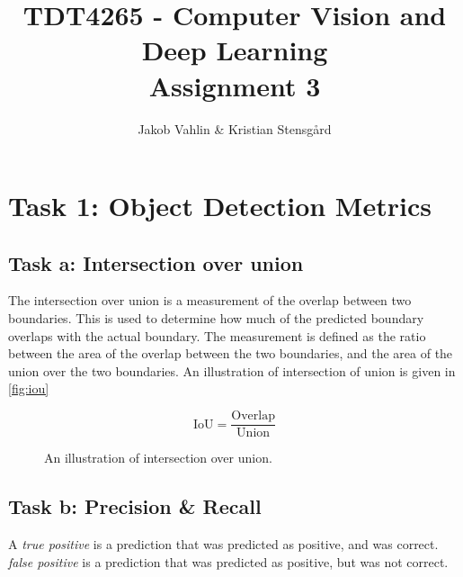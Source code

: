 \documentclass{article}
\date{}
\title{TDT4265 - Computer Vision and Deep Learning \\Assignment 3}
\author{Jakob Vahlin & Kristian Stensgård}
\begin{document}
\maketitle

\tableofcontents
\newpage

\section{Task 1: Object Detection Metrics}
\subsection{Task a: Intersection over union}
The intersection over union is a measurement of the overlap between two boundaries. This is used to determine how much of the predicted boundary overlaps with the actual boundary. The measurement is defined as the ratio between the area of the overlap between the two boundaries, and the area of the union over the two boundaries. An illustration of intersection of union is given in \autoref{fig:iou}

\begin{equation}
    \text{IoU} = \frac{\text{Overlap}}{\text{Union}}
\end{equation}

\begin{figure}[H]
    \centering
    \caption{An illustration of intersection over union.}

    \label{fig:iou}
\end{figure}


\subsection{Task b: Precision \& Recall}
A \textit{true positive} is a prediction that was predicted as positive, and was correct. \textit{false positive} is a prediction that was predicted as positive, but was not correct.
\end{document}

